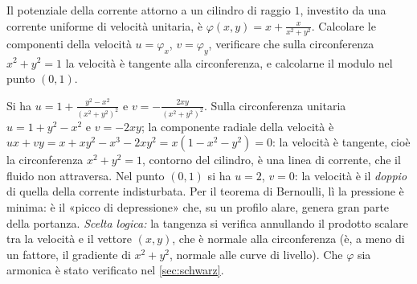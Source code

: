 \begin{esercizio}
Il potenziale della corrente attorno a un cilindro di raggio $1$, investito da una
corrente uniforme di velocità unitaria, è $\varphi(x,y)=x+\frac x{x^{2}+y^{2}}$. Calcolare le
componenti della velocità $u=\varphi_{x}$, $v=\varphi_{y}$, verificare che sulla circonferenza
$x^{2}+y^{2}=1$ la velocità è tangente alla circonferenza, e calcolarne il modulo nel
punto $(0,1)$.
\begin{soluzione}
Si ha $u=1+\frac{y^{2}-x^{2}}{(x^{2}+y^{2})^{2}}$ e $v=-\frac{2xy}{(x^{2}+y^{2})^{2}}$. Sulla
circonferenza unitaria $u=1+y^{2}-x^{2}$ e $v=-2xy$; la componente radiale della velocità
è $ux+vy=x+xy^{2}-x^{3}-2xy^{2}=x(1-x^{2}-y^{2})=0$: la velocità è tangente, cioè la
circonferenza $x^{2}+y^{2}=1$, contorno del cilindro, è una linea di corrente, che il
fluido non attraversa. Nel punto $(0,1)$ si ha
$u=2$, $v=0$: la velocità è il \emph{doppio} di quella della corrente indisturbata. Per il
teorema di Bernoulli, lì la pressione è minima: è il «picco di depressione» che, su un
profilo alare, genera gran parte della portanza. \emph{Scelta logica:} la tangenza si
verifica annullando il prodotto scalare tra la velocità e il vettore $(x,y)$, che è
normale alla circonferenza (è, a meno di un fattore, il gradiente di $x^{2}+y^{2}$, normale
alle curve di livello). Che $\varphi$ sia armonica è stato verificato nel
\cref{sec:schwarz}.
\end{soluzione}
\end{esercizio}
